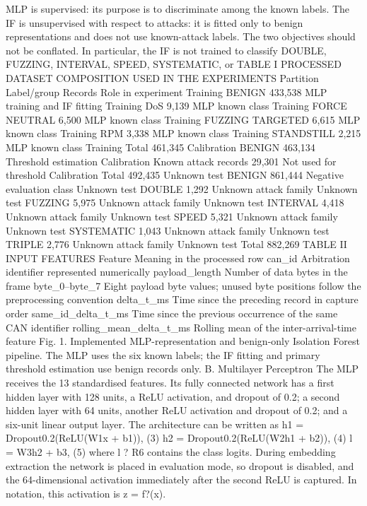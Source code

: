 \documentclass[
]{article}
\begin{document}
MLP is supervised: its purpose is to discriminate among the known
labels. The IF is unsupervised with respect to attacks: it is fitted
only to benign representations and does not use known-attack labels. The
two objectives should not be conflated. In particular, the IF is not
trained to classify DOUBLE, FUZZING, INTERVAL, SPEED, SYSTEMATIC, or
TABLE I PROCESSED DATASET COMPOSITION USED IN THE EXPERIMENTS Partition
Label/group Records Role in experiment Training BENIGN 433,538 MLP
training and IF fitting Training DoS 9,139 MLP known class Training
FORCE NEUTRAL 6,500 MLP known class Training FUZZING TARGETED 6,615 MLP
known class Training RPM 3,338 MLP known class Training STANDSTILL 2,215
MLP known class Training Total 461,345 Calibration BENIGN 463,134
Threshold estimation Calibration Known attack records 29,301 Not used
for threshold Calibration Total 492,435 Unknown test BENIGN 861,444
Negative evaluation class Unknown test DOUBLE 1,292 Unknown attack
family Unknown test FUZZING 5,975 Unknown attack family Unknown test
INTERVAL 4,418 Unknown attack family Unknown test SPEED 5,321 Unknown
attack family Unknown test SYSTEMATIC 1,043 Unknown attack family
Unknown test TRIPLE 2,776 Unknown attack family Unknown test Total
882,269 TABLE II INPUT FEATURES Feature Meaning in the processed row
can\_id Arbitration identifier represented numerically payload\_length
Number of data bytes in the frame byte\_0--byte\_7 Eight payload byte
values; unused byte positions follow the preprocessing convention
delta\_t\_ms Time since the preceding record in capture order
same\_id\_delta\_t\_ms Time since the previous occurrence of the same
CAN identifier rolling\_mean\_delta\_t\_ms Rolling mean of the
inter-arrival-time feature Fig. 1. Implemented MLP-representation and
benign-only Isolation Forest pipeline. The MLP uses the six known
labels; the IF fitting and primary threshold estimation use benign
records only. B. Multilayer Perceptron The MLP receives the 13
standardised features. Its fully connected network has a first hidden
layer with 128 units, a ReLU activation, and dropout of 0.2; a second
hidden layer with 64 units, another ReLU activation and dropout of 0.2;
and a six-unit linear output layer. The architecture can be written as
h1 = Dropout0.2(ReLU(W1x + b1)), (3) h2 = Dropout0.2(ReLU(W2h1 + b2)),
(4) l = W3h2 + b3, (5) where l ? R6 contains the class logits. During
embedding extraction the network is placed in evaluation mode, so
dropout is disabled, and the 64-dimensional activation immediately after
the second ReLU is captured. In notation, this activation is z = f?(x).
\end{document}
